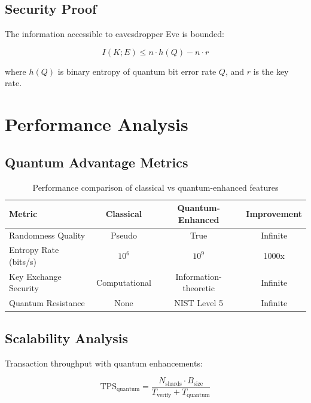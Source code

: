 \documentclass[11pt,a4paper]{article}
\begin{document}
\subsection{Security Proof}

The information accessible to eavesdropper Eve is bounded:

\begin{equation}
I(K;E) \leq n \cdot h(Q) - n \cdot r
\end{equation}

where $h(Q)$ is binary entropy of quantum bit error rate $Q$, and $r$ is the key rate.

\section{Performance Analysis}

\subsection{Quantum Advantage Metrics}

\begin{table}[H]
\centering
\begin{tabular}{|l|c|c|c|}
\hline
\textbf{Metric} & \textbf{Classical} & \textbf{Quantum-Enhanced} & \textbf{Improvement} \\
\hline
Randomness Quality & Pseudo & True & Infinite \\
Entropy Rate (bits/s) & $10^6$ & $10^9$ & 1000x \\
Key Exchange Security & Computational & Information-theoretic & Infinite \\
Quantum Resistance & None & NIST Level 5 & Infinite \\
\hline
\end{tabular}
\caption{Performance comparison of classical vs quantum-enhanced features}
\end{table}

\subsection{Scalability Analysis}

Transaction throughput with quantum enhancements:

\begin{equation}
\text{TPS}_{\text{quantum}} = \frac{N_{\text{shards}} \cdot B_{\text{size}}}{T_{\text{verify}} + T_{\text{quantum}}}
\end{equation}
\end{document}

